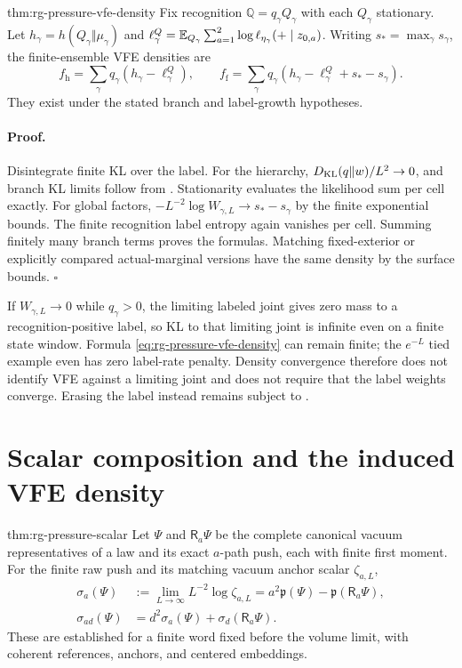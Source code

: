 {thm:rg-pressure-vfe-density}
Fix recognition $\mathbb Q=q_\gamma Q_\gamma$ with each $Q_\gamma$
stationary. Let $h_\gamma=h(Q_\gamma\Vert\mu_\gamma)$ and
$\ell_\gamma^Q=\mathbb E_{Q_\gamma}\sum_{a=1}^2
\log\ell_{\eta_\gamma}(+\mid z_{0,a})$.
Writing $s_* =\max_\gamma s_\gamma$, the finite-ensemble VFE densities are
\begin{equation}
 f_{\mathrm h}=\sum_\gamma q_\gamma(h_\gamma-\ell_\gamma^Q),\qquad
 f_{\mathrm f}=\sum_\gamma q_\gamma
       (h_\gamma-\ell_\gamma^Q+s_*-s_\gamma).
 \label{eq:rg-pressure-vfe-density}
\end{equation}
They exist under the stated branch and label-growth hypotheses.

\paragraph{Proof.}
Disintegrate finite KL over the label. For the hierarchy,
$D_{\mathrm{KL}}(q\Vert w)/L^2\to0$, and branch KL limits follow from
. Stationarity evaluates the likelihood
sum per cell exactly. For global factors,
$-L^{-2}\log W_{\gamma,L}\to s_*-s_\gamma$ by the finite exponential
bounds. The finite recognition label entropy again vanishes per cell.
Summing finitely many branch terms proves the formulas. Matching
fixed-exterior or explicitly compared actual-marginal versions have the
same density by the surface bounds.
$\square$

If $W_{\gamma,L}\to0$ while $q_\gamma>0$, the limiting labeled joint
gives zero mass to a recognition-positive label, so KL to that limiting
joint is infinite even on a finite state window. Formula
\cref{eq:rg-pressure-vfe-density} can remain finite; the $e^{-L}$ tied
example even has zero label-rate penalty. Density convergence therefore
does not identify VFE against a limiting joint and does not require that
the label weights converge. Erasing the label instead remains subject to
. 

\section{Scalar composition and the induced VFE density}
\label{sec:rg-pressure-scalar}

{thm:rg-pressure-scalar}
Let $\Psi$ and $\mathsf R_a\Psi$ be the complete canonical vacuum
representatives of a law and its exact $a$-path push, each with finite
first moment. For the finite raw push and its matching vacuum anchor
scalar $\zeta_{a,L}$,
\begin{align}
 \sigma_a(\Psi)&:=\lim_{L\to\infty}L^{-2}\log\zeta_{a,L}
        =a^2\mathfrak p(\Psi)-\mathfrak p(\mathsf R_a\Psi),
 \label{eq:rg-pressure-scalar-density}\\
 \sigma_{ad}(\Psi)&=d^2\sigma_a(\Psi)
                       +\sigma_d(\mathsf R_a\Psi).
 \label{eq:rg-pressure-scalar-word}
\end{align}
These are established for a finite word fixed before the volume limit,
with coherent references, anchors, and centered embeddings.

